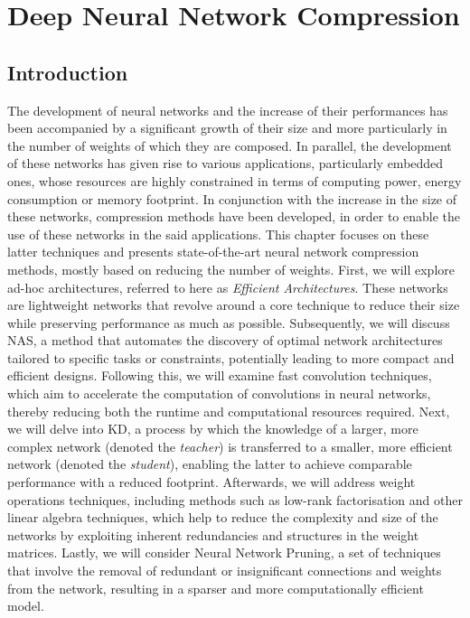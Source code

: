 \chapter{Deep Neural Network Compression}
\label{chap:sota}


\localtableofcontents


\section{Introduction}
The development of neural networks and the increase of their performances has
been accompanied by a significant growth of their size and more particularly
in the number of weights of which they are composed. In parallel, the
development of these networks has given rise to various applications,
particularly embedded ones, whose resources are highly constrained in terms of
computing power, energy consumption or memory footprint. In conjunction with the
increase in the size of these networks, compression methods have been developed,
in order to enable the use of these networks in the said applications. This
chapter focuses on these latter techniques and presents state-of-the-art neural
network compression methods, mostly based on reducing the number of weights.
First, we will explore ad-hoc architectures, referred to here as \emph{Efficient
Architectures}. These networks are lightweight networks that revolve around a
core technique to reduce their size while preserving performance as much as
possible. Subsequently, we will discuss \ac{NAS}, a method that automates the
discovery of optimal network architectures tailored to specific tasks or
constraints, potentially leading to more compact and efficient designs.
Following this, we will examine fast convolution techniques, which aim to
accelerate the computation of convolutions in neural networks, thereby reducing
both the runtime and computational resources required. Next, we will delve into
\ac{KD}, a process by which the knowledge of a larger, more complex network
(denoted the \emph{teacher}) is transferred to a smaller, more efficient network
(denoted the \emph{student}), enabling the latter to achieve comparable
performance with a reduced footprint. Afterwards, we will address weight
operations techniques, including methods such as low-rank factorisation and
other linear algebra techniques, which help to reduce the complexity and size of
the networks by exploiting inherent redundancies and structures in the weight
matrices. Lastly, we will consider Neural Network Pruning, a set of techniques
that involve the removal of redundant or insignificant connections and weights
from the network, resulting in a sparser and more computationally efficient
model.\\

